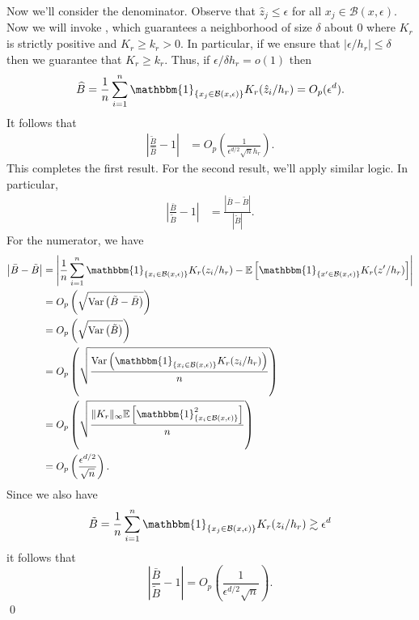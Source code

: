 \documentclass[11pt]{article}
\begin{document}
Now we'll consider the denominator. Observe that $\hat{z}_j \leq \epsilon$ for all $x_j \in \mathcal{B}(x, \epsilon)$. Now we will invoke , which guarantees a neighborhood of size $\delta$ about $0$ where $K_r$ is strictly positive and $K_r \geq k_r > 0$. In particular, if we ensure that $|\epsilon/h_r| \leq \delta$ then we guarantee that $K_r \geq k_r$. Thus, if $\epsilon/\delta h_r = o(1)$ then 
\[\widehat{B} = \frac{1}{n}\sum_{i = 1}^n\mathbbm{1}_{\{x_j \in \mathcal{B}(x, \epsilon)\}}K_r(\hat{z}_i/h_r) =  O_p(\epsilon^d).\]
It follows that 
\begin{align}
    \left|\frac{\tilde{B}}{\widehat{B}} - 1\right| &= O_p\left(\frac{1}{\epsilon^{d/2}\sqrt{n}h_r}\right).
\end{align}
This completes the first result. For the second result, we'll apply similar logic. In particular,
\begin{align}
    \left|\frac{\bar{B}}{\tilde{B}} - 1\right| &= \frac{\left|\bar{B} - \tilde{B}\right|}{\left|\tilde{B}\right|}.
\end{align}
For the numerator, we have 
\begin{align}
    \left|\bar{B} - \tilde{B}\right| &= \left|\frac{1}{n}\sum_{i = 1}^n\mathbbm{1}_{\{x_i \in \mathcal{B}(x, \epsilon)\}}K_r(z_i/h_r) - \mathbb{E}\left[\mathbbm{1}_{\{x' \in \mathcal{B}(x, \epsilon)\}}K_r(z'/h_r)\right]\right| \\
    &= O_p\left(\sqrt{\text{Var}\left(\tilde{B} - \bar{B}\right)}\right) \\
    &= O_p\left(\sqrt{\text{Var}\left(\tilde{B}\right)}\right) \\
    &= O_p\left(\sqrt{\frac{\text{Var}\left(\mathbbm{1}_{\{x_i \in \mathcal{B}(x, \epsilon)\}}K_r(z_i/h_r)\right)}{n}}\right) \\
    &= O_p\left(\sqrt{\frac{\|K_r\|_{\infty}\mathbb{E}\left[\mathbbm{1}_{\{x_i \in \mathcal{B}(x, \epsilon)\}}^2\right]}{n}}\right) \\
    &= O_p\left(\frac{\epsilon^{d/2}}{\sqrt{n}}\right).
\end{align}
Since we also have 
\[\tilde{B} = \frac{1}{n}\sum_{i = 1}^n\mathbbm{1}_{\{x_j \in \mathcal{B}(x, \epsilon)\}}K_r(z_i/h_r) \gtrsim \epsilon^d\]
it follows that 
\begin{equation}
    \left|\frac{\bar{B}}{\tilde{B}} - 1\right| = O_p\left(\frac{1}{\epsilon^{d/2}\sqrt{n}}\right).
\end{equation}
\qed{}
\end{document}
